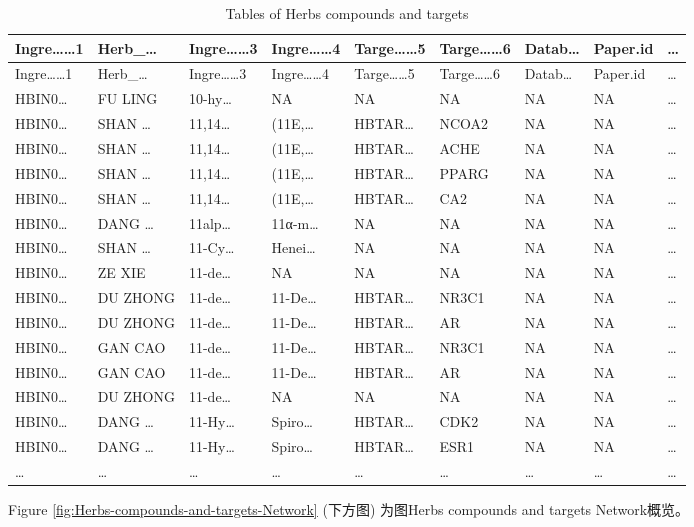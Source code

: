 \documentclass[
]{article}
\begin{document}
\begin{longtable}[]{@{}lllllllll@{}}
\caption{\label{tab:tables-of-Herbs-compounds-and-targets}Tables of Herbs compounds and targets}\tabularnewline
\toprule
Ingre\ldots\ldots1 & Herb\_\ldots{} & Ingre\ldots\ldots3 & Ingre\ldots\ldots4 & Targe\ldots\ldots5 & Targe\ldots\ldots6 & Datab\ldots{} & Paper.id & \ldots{}\tabularnewline
\midrule
\endfirsthead
\toprule
Ingre\ldots\ldots1 & Herb\_\ldots{} & Ingre\ldots\ldots3 & Ingre\ldots\ldots4 & Targe\ldots\ldots5 & Targe\ldots\ldots6 & Datab\ldots{} & Paper.id & \ldots{}\tabularnewline
\midrule
\endhead
HBIN0\ldots{} & FU LING & 10-hy\ldots{} & NA & NA & NA & NA & NA & \ldots{}\tabularnewline
HBIN0\ldots{} & SHAN \ldots{} & 11,14\ldots{} & (11E,\ldots{} & HBTAR\ldots{} & NCOA2 & NA & NA & \ldots{}\tabularnewline
HBIN0\ldots{} & SHAN \ldots{} & 11,14\ldots{} & (11E,\ldots{} & HBTAR\ldots{} & ACHE & NA & NA & \ldots{}\tabularnewline
HBIN0\ldots{} & SHAN \ldots{} & 11,14\ldots{} & (11E,\ldots{} & HBTAR\ldots{} & PPARG & NA & NA & \ldots{}\tabularnewline
HBIN0\ldots{} & SHAN \ldots{} & 11,14\ldots{} & (11E,\ldots{} & HBTAR\ldots{} & CA2 & NA & NA & \ldots{}\tabularnewline
HBIN0\ldots{} & DANG \ldots{} & 11alp\ldots{} & 11α-m\ldots{} & NA & NA & NA & NA & \ldots{}\tabularnewline
HBIN0\ldots{} & SHAN \ldots{} & 11-Cy\ldots{} & Henei\ldots{} & NA & NA & NA & NA & \ldots{}\tabularnewline
HBIN0\ldots{} & ZE XIE & 11-de\ldots{} & NA & NA & NA & NA & NA & \ldots{}\tabularnewline
HBIN0\ldots{} & DU ZHONG & 11-de\ldots{} & 11-De\ldots{} & HBTAR\ldots{} & NR3C1 & NA & NA & \ldots{}\tabularnewline
HBIN0\ldots{} & DU ZHONG & 11-de\ldots{} & 11-De\ldots{} & HBTAR\ldots{} & AR & NA & NA & \ldots{}\tabularnewline
HBIN0\ldots{} & GAN CAO & 11-de\ldots{} & 11-De\ldots{} & HBTAR\ldots{} & NR3C1 & NA & NA & \ldots{}\tabularnewline
HBIN0\ldots{} & GAN CAO & 11-de\ldots{} & 11-De\ldots{} & HBTAR\ldots{} & AR & NA & NA & \ldots{}\tabularnewline
HBIN0\ldots{} & DU ZHONG & 11-de\ldots{} & NA & NA & NA & NA & NA & \ldots{}\tabularnewline
HBIN0\ldots{} & DANG \ldots{} & 11-Hy\ldots{} & Spiro\ldots{} & HBTAR\ldots{} & CDK2 & NA & NA & \ldots{}\tabularnewline
HBIN0\ldots{} & DANG \ldots{} & 11-Hy\ldots{} & Spiro\ldots{} & HBTAR\ldots{} & ESR1 & NA & NA & \ldots{}\tabularnewline
\ldots{} & \ldots{} & \ldots{} & \ldots{} & \ldots{} & \ldots{} & \ldots{} & \ldots{} & \ldots{}\tabularnewline
\bottomrule
\end{longtable}

Figure \ref{fig:Herbs-compounds-and-targets-Network} (下方图) 为图Herbs compounds and targets Network概览。
\end{document}
